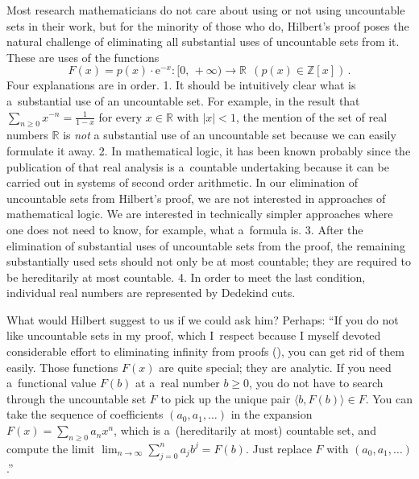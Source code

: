 \documentclass[10pt]{article}
\def\Z{\mathbb{Z}}
\def\R{\mathbb{R}}
\def\ds{\dots}
\def\cc{\colon}
\begin{document}
Most research mathematicians do not care about using or not using uncountable sets in their work, but for the minority of 
those who do, Hilbert's proof poses the natural challenge of eliminating all substantial uses of uncountable sets from it. These are uses of the functions 
$$
F(x)=p(x)\cdot\mathrm{e}^{-x}\cc[0,\,+\infty)\to\R\ \ (p(x)\in\Z[x])\,.
$$  
Four explanations are in order. 1. It should be intuitively clear what is 
a~substantial use of an uncountable 
set. For example, in the result that $\sum_{n\ge0}x^{-n}=\frac{1}{1-x}$ for every $x\in\R$ with $|x|<1$, the mention of the set 
of real numbers $\R$ is 
{\em not} a substantial use of an uncountable set because we can easily formulate it away. 2. In mathematical logic, it has 
been known probably since the publication of \cite{weyl} that real analysis is a~countable undertaking 
because it can be carried out in systems of second order arithmetic. 
In our elimination of uncountable sets from Hilbert's proof, we are not interested in approaches of mathematical logic. We are 
interested  in technically simpler approaches where one does 
not need to know, for example, what 
a~formula is. 3. After the elimination of substantial uses of uncountable sets 
from the proof, the remaining substantially used sets should not only be at most countable; they 
are required to be hereditarily at most countable. 4. In order to meet the last condition, individual real numbers 
are represented by Dedekind cuts.

What would Hilbert suggest to us if we could ask him? Perhaps: ``If you do not like uncountable sets in my proof, which I~respect because I myself devoted considerable effort to eliminating infinity from proofs 
(\cite{zach}), you can get rid of them easily. Those functions $F(x)$ are quite special; they are analytic. If you 
need a~functional value $F(b)$ at a~real number $b\ge0$, you do not have to search through the uncountable set $F$ to pick up 
the unique pair $\langle b,F(b)\rangle\in F$. You can take the sequence of coefficients $(a_0,a_1,\ds)$ in the 
expansion $F(x)=\sum_{n\ge0}a_nx^n$, which is a~(hereditarily at most) countable set, and compute the limit $\lim_{n\to\infty}\sum_{j=0}^n 
a_jb^j=F(b)$. Just replace $F$ with $(a_0,a_1,\ds)$.'' 
\end{document}
